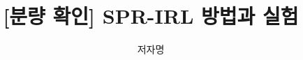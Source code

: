 \documentclass[sigconf,nonacm]{acmart}
\theoremstyle{acmplain}
\begin{document}
\title{[분량 확인] SPR-IRL 방법과 실험}
\author{저자명}
\renewcommand{\shortauthors}{저자명}
\maketitle






\end{document}
